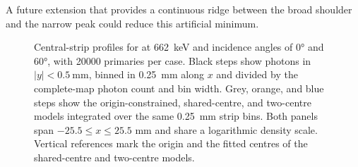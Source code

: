 A future extension that provides a continuous ridge between the broad shoulder and the narrow peak could reduce this artificial minimum.

\begin{figure}[!htbp]
  \centering
  \captionsetup{font=small}
  \caption{Central-strip profiles for  at \qty{662}{\kilo\electronvolt} and incidence angles of \ang{0} and \ang{60}, with \num{20000} primaries per case. Black steps show photons in $|y|<\qty{0.5}{\milli\metre}$, binned in \qty{0.25}{\milli\metre} along $x$ and divided by the complete-map photon count and bin width. Grey, orange, and blue steps show the origin-constrained, shared-centre, and two-centre models integrated over the same \qty{0.25}{\milli\metre} strip bins. Both panels span $-25.5\leq x\leq25.5$ mm and share a logarithmic density scale. Vertical references mark the origin and the fitted centres of the shared-centre and two-centre models.}
  \label{fig:coordinate-extensions}
\end{figure}